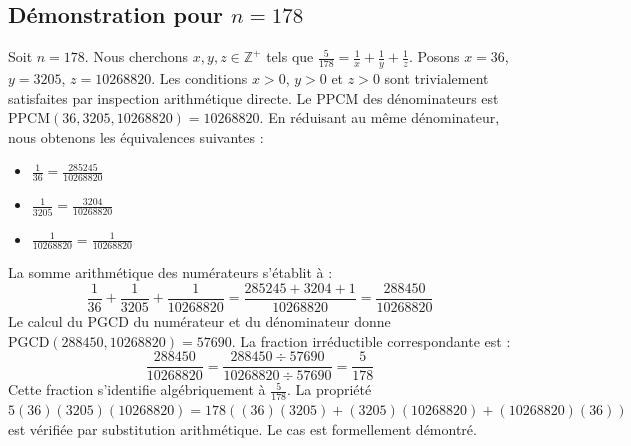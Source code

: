 \documentclass[12pt,a4paper]{article}
\begin{document}
\subsection{Démonstration pour $n = 178$}
Soit $n = 178$. Nous cherchons $x, y, z \in \mathbb{Z}^{+}$ tels que $\frac{5}{178} = \frac{1}{x} + \frac{1}{y} + \frac{1}{z}$.
Posons $x = 36$, $y = 3205$, $z = 10268820$.
Les conditions $x > 0$, $y > 0$ et $z > 0$ sont trivialement satisfaites par inspection arithmétique directe.
Le PPCM des dénominateurs est $\text{PPCM}(36, 3205, 10268820) = 10268820$.
En réduisant au même dénominateur, nous obtenons les équivalences suivantes :
\begin{itemize}
    \item $\frac{1}{36} = \frac{285245}{10268820}$
    \item $\frac{1}{3205} = \frac{3204}{10268820}$
    \item $\frac{1}{10268820} = \frac{1}{10268820}$
\end{itemize}
La somme arithmétique des numérateurs s'établit à :
$$ \frac{1}{36} + \frac{1}{3205} + \frac{1}{10268820} = \frac{285245 + 3204 + 1}{10268820} = \frac{288450}{10268820} $$
Le calcul du PGCD du numérateur et du dénominateur donne $\text{PGCD}(288450, 10268820) = 57690$.
La fraction irréductible correspondante est :
$$ \frac{288450}{10268820} = \frac{288450 \div 57690}{10268820 \div 57690} = \frac{5}{178} $$
Cette fraction s'identifie algébriquement à $\frac{5}{178}$.
La propriété $5(36)(3205)(10268820) = 178((36)(3205) + (3205)(10268820) + (10268820)(36))$ est vérifiée par substitution arithmétique.
Le cas est formellement démontré.
\end{document}
